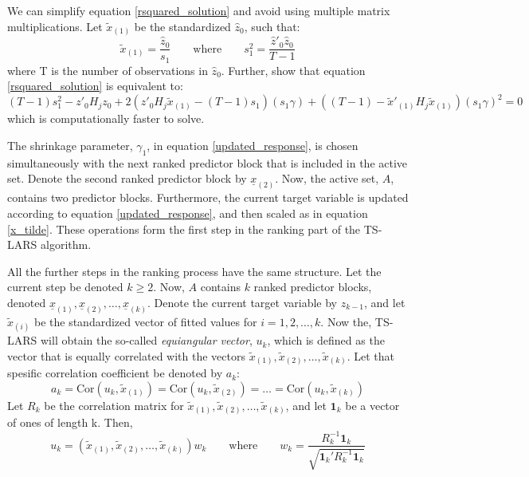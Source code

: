 We can simplify equation \eqref{rsquared_solution} and avoid using multiple matrix multiplications. Let $\tilde{x}_{(1)}$ be the standardized $\hat{z}_0$, such that:
\begin{equation}\label{x_tilde}
	\tilde{x}_{(1)} = \frac{\hat{z}_0}{s_1} \quad \quad \text{where} \quad \quad s_1^2 = \frac{\hat{z}'_0 \hat{z}_0}{T - 1}
\end{equation}
\noindent where T is the number of observations in $\hat{z}_0$. Further, \textcite{gelper2008} show that equation \eqref{rsquared_solution} is equivalent to:
\begin{equation}\label{rsquared_solution_simplified}
	(T - 1) s_1^2 - z'_0 H_j z_0 + 2(z'_0 H_j \tilde{x}_{(1)} - (T - 1) s_1)(s_1 \gamma) + ((T - 1) - \tilde{x}'_{(1)} H_j \tilde{x}_{(1)})(s_1 \gamma)^2 = 0
\end{equation}
\noindent which is computationally faster to solve.

The shrinkage parameter, $\gamma_1$, in equation \eqref{updated_response}, is chosen simultaneously with the next ranked predictor block that is included in the active set. Denote the second ranked predictor block by $\underline{x}_{(2)}$. Now, the active set, $A$, contains two predictor blocks. Furthermore, the current target variable is updated according to equation \eqref{updated_response}, and then scaled as in equation \eqref{x_tilde}. These operations form the first step in the ranking part of the TS-LARS algorithm.

All the further steps in the ranking process have the same structure. Let the current step be denoted $k \geq 2$. Now, $A$ contains $k$ ranked predictor blocks, denoted $\underline{x}_{(1)}, \underline{x}_{(2)}, \ldots, \underline{x}_{(k)}$. Denote the current target variable by $z_{k - 1}$, and let $\tilde{x}_{(i)}$ be the standardized vector of fitted values for $i = 1, 2, \ldots, k$. Now the, TS-LARS will obtain the so-called \textit{equiangular vector}, $u_k$, which is defined as the vector that is equally correlated with the vectors $\tilde{x}_{(1)}, \tilde{x}_{(2)}, \ldots, \tilde{x}_{(k)}$. Let that spesific correlation coefficient be denoted by $a_k$:
\begin{equation}\label{correlation}
	a_k = \text{Cor}(u_k, \tilde{x}_{(1)}) = \text{Cor}(u_k, \tilde{x}_{(2)}) = \ldots = \text{Cor}(u_k, \tilde{x}_{(k)})
\end{equation}
\noindent Let $R_k$ be the correlation matrix for $\tilde{x}_{(1)}, \tilde{x}_{(2)}, \ldots, \tilde{x}_{(k)}$, and let $\mathbf{1}_k$ be a vector of ones of length k. Then,
\begin{equation}\label{equiangular_vector}
	u_k = (\tilde{x}_{(1)}, \tilde{x}_{(2)}, \ldots, \tilde{x}_{(k)}) w_k \quad \quad \text{where} \quad \quad w_k = \frac{R_k^{-1} \mathbf{1}_k}{\sqrt{\mathbf{1}_k' R_k^{-1} \mathbf{1}_k}}
\end{equation}


